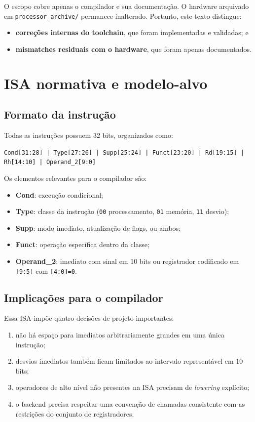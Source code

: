 \documentclass[12pt,a4paper]{article}
\begin{document}
O escopo cobre apenas o compilador e sua documentação. O hardware arquivado em \texttt{processor\_archive/} permanece inalterado. Portanto, este texto distingue:
\begin{itemize}[leftmargin=1.5em]
    \item \textbf{correções internas do toolchain}, que foram implementadas e validadas; e
    \item \textbf{mismatches residuais com o hardware}, que foram apenas documentados.
\end{itemize}

\section{ISA normativa e modelo-alvo}
\subsection{Formato da instrução}
Todas as instruções possuem 32 bits, organizados como:
\begin{center}
\texttt{Cond[31:28] | Type[27:26] | Supp[25:24] | Funct[23:20] | Rd[19:15] | Rh[14:10] | Operand\_2[9:0]}
\end{center}

Os elementos relevantes para o compilador são:
\begin{itemize}[leftmargin=1.5em]
    \item \textbf{Cond}: execução condicional;
    \item \textbf{Type}: classe da instrução (\texttt{00} processamento, \texttt{01} memória, \texttt{11} desvio);
    \item \textbf{Supp}: modo imediato, atualização de flags, ou ambos;
    \item \textbf{Funct}: operação específica dentro da classe;
    \item \textbf{Operand\_2}: imediato com sinal em 10 bits ou registrador codificado em \texttt{[9:5]} com \texttt{[4:0]=0}.
\end{itemize}

\subsection{Implicações para o compilador}
Essa ISA impõe quatro decisões de projeto importantes:
\begin{enumerate}[leftmargin=1.5em]
    \item não há espaço para imediatos arbitrariamente grandes em uma única instrução;
    \item desvios imediatos também ficam limitados ao intervalo representável em 10 bits;
    \item operadores de alto nível não presentes na ISA precisam de \emph{lowering} explícito;
    \item o backend precisa respeitar uma convenção de chamadas consistente com as restrições do conjunto de registradores.
\end{enumerate}
\end{document}
